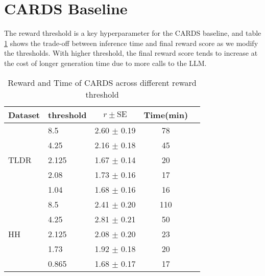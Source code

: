 \section{CARDS Baseline}
\vspace{-0.5em}
The reward threshold is a key hyperparameter for the CARDS baseline, and table \cref{tab:CARDS} shows the trade-off between inference time and final reward score as we modify the thresholds. With higher threshold, the final reward score tends to increase at the cost of longer generation time due to more calls to the LLM.

\begin{table}[htbp]
    \centering
    \footnotesize
    \begin{tabular}{l l c c c}
        \toprule
        \textbf{Dataset} & \textbf{threshold} & $r \pm \text{SE}$  & \textbf{Time(min)} \\
        \midrule
        \multirow{5}{*}{TLDR} & 8.5 & 2.60 $\pm$ 0.19 & 78\\
        &4.25 &  2.16 $\pm$ 0.18 & 45\\
        & 2.125  & 1.67 $\pm$ 0.14 & 20\\
        & 2.08  & 1.73 $\pm$ 0.16 & 17\\
        & 1.04  & 1.68 $\pm$ 0.16 & 16\\
        \midrule
        \multirow{5}{*}{HH} & 8.5 & 2.41 $\pm$ 0.20 & 110\\
        & 4.25 &  2.81 $\pm$ 0.21 & 50\\
        & 2.125  & 2.08 $\pm$ 0.20 & 23\\
        & 1.73  & 1.92 $\pm$ 0.18 & 20\\
        & 0.865  & 1.68 $\pm$ 0.17 & 17\\
        \bottomrule
    \end{tabular}
    \caption{Reward and Time of CARDS across different reward threshold}
    \label{tab:CARDS}
\end{table}
